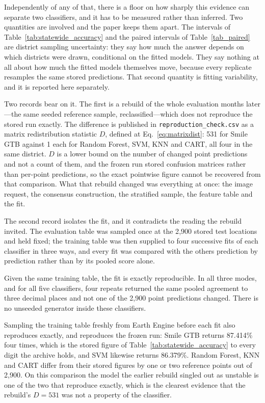 \documentclass[conference]{IEEEtran}
\begin{document}
Independently of any of that, there is a floor on how sharply this evidence can separate two classifiers, and it has to be measured rather than inferred. Two quantities are involved and the paper keeps them apart. The intervals of Table~\ref{tab:statewide_accuracy} and the paired intervals of Table~\ref{tab_paired} are district sampling uncertainty: they say how much the answer depends on which districts were drawn, conditional on the fitted models. They say nothing at all about how much the fitted models themselves move, because every replicate resamples the same stored predictions. That second quantity is fitting variability, and it is reported here separately.

Two records bear on it. The first is a rebuild of the whole evaluation months later---the same seeded reference sample, reclassified---which does not reproduce the stored run exactly. The difference is published in \texttt{reproduction\_check.csv} as a matrix redistribution statistic $D$, defined at Eq.~\eqref{eq:matrixdist}: 531 for Smile GTB against 1 each for Random Forest, SVM, KNN and CART, all four in the same district. $D$ is a lower bound on the number of changed point predictions and not a count of them, and the frozen run stored confusion matrices rather than per-point predictions, so the exact pointwise figure cannot be recovered from that comparison. What that rebuild changed was everything at once: the image request, the consensus construction, the stratified sample, the feature table and the fit.

The second record isolates the fit, and it contradicts the reading the rebuild invited. The evaluation table was sampled once at the 2{,}900 stored test locations and held fixed; the training table was then supplied to four successive fits of each classifier in three ways, and every fit was compared with the others prediction by prediction rather than by its pooled score alone.

Given the same training table, the fit is exactly reproducible. In all three modes, and for all five classifiers, four repeats returned the same pooled agreement to three decimal places and not one of the 2{,}900 point predictions changed. There is no unseeded generator inside these classifiers.

Sampling the training table freshly from Earth Engine before each fit also reproduces exactly, and reproduces the frozen run: Smile GTB returns 87.414\% four times, which is the stored figure of Table~\ref{tab:statewide_accuracy} to every digit the archive holds, and SVM likewise returns 86.379\%. Random Forest, KNN and CART differ from their stored figures by one or two reference points out of 2{,}900. On this comparison the model the earlier rebuild singled out as unstable is one of the two that reproduce exactly, which is the clearest evidence that the rebuild's $D=531$ was not a property of the classifier.
\end{document}
